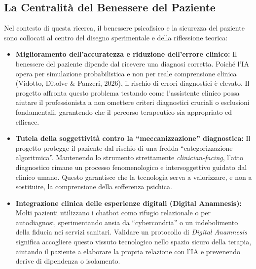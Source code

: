 \documentclass[11pt,a4paper]{article}
\begin{document}
\subsection{La Centralità del Benessere del Paziente}
Nel contesto di questa ricerca, il benessere psicofisico e la sicurezza del paziente sono collocati al centro del disegno sperimentale e della riflessione teorica:
\begin{itemize}
    \item \textbf{Miglioramento dell'accuratezza e riduzione dell'errore clinico:} Il benessere del paziente dipende dal ricevere una diagnosi corretta. Poiché l'IA opera per simulazione probabilistica e non per reale comprensione clinica (Vidotto, Ditolve \& Panzeri, 2026), il rischio di errori diagnostici è elevato. Il progetto affronta questo problema testando come l'assistente clinico possa aiutare il professionista a non omettere criteri diagnostici cruciali o esclusioni fondamentali, garantendo che il percorso terapeutico sia appropriato ed efficace.
    \item \textbf{Tutela della soggettività contro la ``meccanizzazione'' diagnostica:} Il progetto protegge il paziente dal rischio di una fredda ``categorizzazione algoritmica''. Mantenendo lo strumento strettamente \textit{clinician-facing}, l'atto diagnostico rimane un processo fenomenologico e intersoggettivo guidato dal clinico umano. Questo garantisce che la tecnologia serva a valorizzare, e non a sostituire, la comprensione della sofferenza psichica.
    \item \textbf{Integrazione clinica delle esperienze digitali (Digital Anamnesis):} Molti pazienti utilizzano i chatbot como rifugio relazionale o per autodiagnosi, sperimentando ansia da ``cybercondria'' o un indebolimento della fiducia nei servizi sanitari. Validare un protocollo di \textit{Digital Anamnesis} significa accogliere questo vissuto tecnologico nello spazio sicuro della terapia, aiutando il paziente a elaborare la propria relazione con l'IA e prevenendo derive di dipendenza o isolamento.
\end{itemize}
\end{document}
